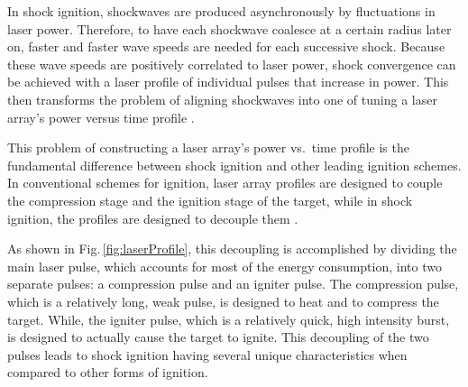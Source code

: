 In shock ignition, shockwaves are produced asynchronously by fluctuations in laser power.  Therefore, to have each shockwave coalesce at a certain radius later on, faster and faster wave speeds are needed for each successive shock.  Because these wave speeds are positively correlated to laser power, shock convergence can be achieved with a laser profile of individual pulses that increase in power. This then transforms the problem of aligning shockwaves into one of tuning a laser array's power versus time profile \citep{terryThesis}.  

This problem of constructing a laser array's power vs.\ time profile is the fundamental difference between shock ignition and other leading ignition schemes.  In conventional schemes for ignition, laser array profiles are designed to couple the compression stage and the ignition stage of the target, while in shock ignition, the profiles are designed to decouple them \citep{perkinsPaper}. 

As shown in Fig.\,\ref{fig:laserProfile}, this decoupling is accomplished by dividing the main laser pulse, which accounts for most of the energy consumption, into two separate pulses: a compression pulse and an igniter pulse.  The compression pulse, which is a relatively long, weak pulse, is designed to heat and to compress the target.  While, the igniter pulse, which is a relatively quick, high intensity burst, is designed to actually cause the target to ignite.  This decoupling of the two pulses leads to shock ignition having several unique characteristics when compared to other forms of ignition.  


